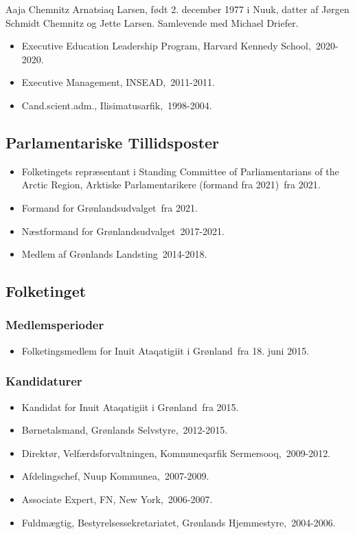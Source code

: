 \documentclass[11pt, a4paper]{awesome-cv}
\begin{document}
\makecvheader[R]
\makelettertitle
\begin{cvletter}
Aaja Chemnitz Arnatsiaq Larsen, født 2. december 1977 i Nuuk, datter af Jørgen Schmidt Chemnitz og Jette Larsen. Samlevende med Michael Driefer.

\begin{itemize}
\item Executive Education Leadership Program, Harvard Kennedy School, 2020-2020.
\item Executive Management, INSEAD, 2011-2011.
\item Cand.scient.adm., Ilisimatusarfik, 1998-2004.
\end{itemize}
\subsection*{Parlamentariske Tillidsposter}
\begin{itemize}
\item Folketingets repræsentant i Standing Committee of Parliamentarians of the Arctic Region, Arktiske Parlamentarikere (formand fra 2021) fra 2021.
\item Formand for Grønlandsudvalget fra 2021.
\item Næstformand for Grønlandsudvalget 2017-2021.
\item Medlem af Grønlands Landsting 2014-2018.
\end{itemize}
\subsection*{Folketinget}
\subsubsection*{Medlemsperioder}
\begin{itemize}
\item Folketingsmedlem for Inuit Ataqatigiit i Grønland fra 18. juni 2015.
\end{itemize}
\subsubsection*{Kandidaturer}
\begin{itemize}
\item Kandidat for Inuit Ataqatigiit i Grønland fra 2015.
\end{itemize}
\begin{itemize}
\item Børnetalsmand, Grønlands Selvstyre, 2012-2015.
\item Direktør, Velfærdsforvaltningen, Kommuneqarfik Sermersooq, 2009-2012.
\item Afdelingschef, Nuup Kommunea, 2007-2009.
\item Associate Expert, FN, New York, 2006-2007.
\item Fuldmægtig, Bestyrelsessekretariatet, Grønlands Hjemmestyre, 2004-2006.
\end{itemize}
\end{cvletter}
\end{document}
